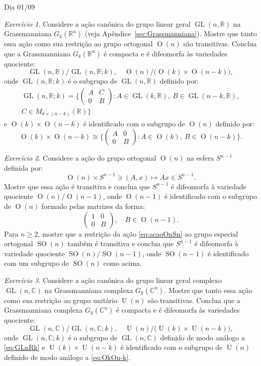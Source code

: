 \documentclass[oneside,11pt]{amsart}
\newcommand{\R}{\mathds R}
\newcommand{\C}{\mathds C}
\DeclareMathOperator{\Or}{O}
\DeclareMathOperator{\SO}{SO}
\DeclareMathOperator{\Ur}{U}
\DeclareMathOperator{\GL}{GL}
\theoremstyle{remark}\newtheorem{exercise}{Exercício}[section]
\theoremstyle{plain}\newtheorem{teo}{Teorema}[section]
\theoremstyle{plain}\newtheorem{lem}[teo]{Lema}
\theoremstyle{plain}\newtheorem{prop}[teo]{Proposição}
\theoremstyle{definition}\newtheorem{defin}[teo]{Definição}
\theoremstyle{remark}\newtheorem{rem}[teo]{Observação}
\theoremstyle{definition}\newtheorem{example}[teo]{Exemplo}
\numberwithin{equation}{section}
\begin{document}
\begin{section}{Dia 01/09}
\begin{exercise}
Considere a ação canônica do grupo linear geral $\GL(n,\R)$ na Grassmanniana $G_k(\R^n)$
(veja Apêndice~\ref{sec:Grassmanniana}). Mostre que tanto essa ação como sua restrição ao grupo ortogonal
$\Or(n)$ são transitivas. Conclua que a Grassmanniana $G_k(\R^n)$ é compacta e é difeomorfa às variedades quociente:
\[\GL(n,\R)/\GL(n,\R;k),\quad\Or(n)/\big(\!\Or(k)\times\Or(n-k)\big),\]
onde $\GL(n,\R;k)$ é o subgrupo de $\GL(n,\R)$ definido por:
\begin{multline}\label{eq:GLnRk}
\GL(n,\R;k)=\Big\{\begin{pmatrix}A&C\\0&B\end{pmatrix}:A\in\GL(k,\R),\ B\in\GL(n-k,\R),\\
C\in M_{k\times(n-k)}(\R)\Big\}
\end{multline}
e $\Or(k)\times\Or(n-k)$ é identificado com o subgrupo de $\Or(n)$ definido por:
\begin{equation}\label{eq:OkOn-k}
\Or(k)\times\Or(n-k)\cong\Big\{\begin{pmatrix}A&0\\0&B\end{pmatrix}:A\in\Or(k),\ B\in\Or(n-k)\Big\}.
\end{equation}
\end{exercise}

\begin{exercise}\label{exe:esferaquocO}
Considere a ação do grupo ortogonal $\Or(n)$ na esfera $S^{n-1}$ definida por:
\begin{equation}\label{eq:acaoOnSn}
\Or(n)\times S^{n-1}\ni(A,x)\longmapsto Ax\in S^{n-1}.
\end{equation}
Mostre que essa ação é transitiva e conclua que $S^{n-1}$ é difeomorfa à variedade quociente $\Or(n)/\Or(n-1)$,
onde $\Or(n-1)$ é identificado com o subgrupo de $\Or(n)$ formado pelas matrizes da forma:
\[\begin{pmatrix}1&0\\0&B\end{pmatrix},\quad B\in\Or(n-1).\]
Para $n\ge2$, mostre que a restrição da ação \eqref{eq:acaoOnSn} ao grupo especial ortogonal $\SO(n)$ também é transitiva
e conclua que $S^{n-1}$ é difeomorfa à variedade quociente $\SO(n)/\SO(n-1)$, onde $\SO(n-1)$ é identificado
com um subgrupo de $\SO(n)$ como acima.
\end{exercise}

\begin{exercise}
Considere a ação canônica do grupo linear geral complexo $\GL(n,\C)$ na Grassmanniana complexa $G_k(\C^n)$.
Mostre que tanto essa ação como sua restrição ao grupo unitário
$\Ur(n)$ são transitivas. Conclua que a Grassmanniana complexa $G_k(\C^n)$ é compacta e é difeomorfa às variedades quociente:
\[\GL(n,\C)/\GL(n,\C;k),\quad\Ur(n)/\big(\!\Ur(k)\times\Ur(n-k)\big),\]
onde $\GL(n,\C;k)$ é o subgrupo de $\GL(n,\C)$ definido de modo análogo a \eqref{eq:GLnRk} e
$\Ur(k)\times\Ur(n-k)$ é identificado com o subgrupo de $\Ur(n)$ definido de modo análogo a \eqref{eq:OkOn-k}.
\end{exercise}


\end{section}
\end{document}
